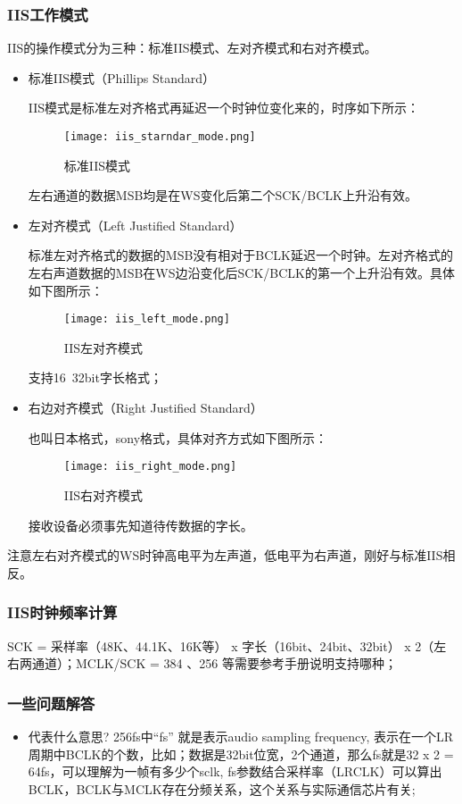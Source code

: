 \subsubsection{IIS工作模式}
IIS的操作模式分为三种：标准IIS模式、左对齐模式和右对齐模式。
\begin{itemize}
\item 标准IIS模式（Phillips Standard）

IIS模式是标准左对齐格式再延迟一个时钟位变化来的，时序如下所示：
\begin{figure}[H]
\centering
\texttt{[image: iis\_starndar\_mode.png]}
\caption{标准IIS模式}
\end{figure}
左右通道的数据MSB均是在WS变化后第二个SCK/BCLK上升沿有效。

\item 左对齐模式（Left Justified Standard）

标准左对齐格式的数据的MSB没有相对于BCLK延迟一个时钟。左对齐格式的左右声道数据的MSB在WS边沿变化后SCK/BCLK的第一个上升沿有效。具体如下图所示：
\begin{figure}[H]
\centering
\texttt{[image: iis\_left\_mode.png]}
\caption{IIS左对齐模式}
\end{figure}
支持16~32bit字长格式；

\item 右边对齐模式（Right Justified Standard）

也叫日本格式，sony格式，具体对齐方式如下图所示：
\begin{figure}[H]
\centering
\texttt{[image: iis\_right\_mode.png]}
\caption{IIS右对齐模式}
\end{figure}
接收设备必须事先知道待传数据的字长。

\end{itemize}

\begin{messagebox}
注意左右对齐模式的WS时钟高电平为左声道，低电平为右声道，刚好与标准IIS相反。
\end{messagebox}

\subsubsection{IIS时钟频率计算}
SCK = 采样率（48K、44.1K、16K等） x  字长（16bit、24bit、32bit） x 2（左右两通道）；MCLK/SCK =  384 、256 等需要参考手册说明支持哪种；

\subsubsection{一些问题解答}
\begin{itemize}
    \item {}代表什么意思?\newline
        256fs中“fs” 就是表示audio sampling frequency, 表示在一个LR周期中BCLK的个数，比如；数据是32bit位宽，2个通道，那么fs就是32 x 2 = 64fs，可以理解为一帧有多少个sclk, fs参数结合采样率（LRCLK）可以算出BCLK，BCLK与MCLK存在分频关系，这个关系与实际通信芯片有关;
\end{itemize}
